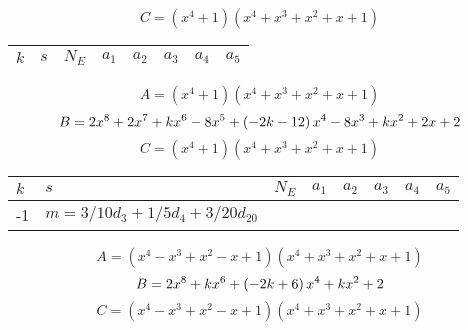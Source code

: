 \documentclass{amsart}
\begin{document}
$$C=(x^4
 + 1)(x^4
 + x^3
 + x^2
 + x
 + 1)$$
\begin{longtable}{|l|l|l|lllll|}
\hline
$k$ & $s$ & $N_E$ & $a_1$ & $a_2$ & $a_3$ & $a_4$ & $a_5$\\
\hline
\hline
\end{longtable}
$$A=(x^4
 + 1)(x^4
 + x^3
 + x^2
 + x
 + 1)$$
$$B=2\*x^8
 + 2\*x^7
 + k\*x^6
 - 8\*x^5
 + \left(-2\*k
 - 12\right) \*x^4
 - 8\*x^3
 + k\*x^2
 + 2\*x
 + 2$$
$$C=(x^4
 + 1)(x^4
 + x^3
 + x^2
 + x
 + 1)$$
\begin{longtable}{|l|l|l|lllll|}
\hline
$k$ & $s$ & $N_E$ & $a_1$ & $a_2$ & $a_3$ & $a_4$ & $a_5$\\
\hline
-1&$m=3/10d_{3}+1/5d_{4}+3/20d_{20}$&&\multicolumn{5}{c|}{}\\
\hline
\end{longtable}
$$A=(x^4
 - x^3
 + x^2
 - x
 + 1)(x^4
 + x^3
 + x^2
 + x
 + 1)$$
$$B=2\*x^8
 + k\*x^6
 + \left(-2\*k
 + 6\right) \*x^4
 + k\*x^2
 + 2$$
$$C=(x^4
 - x^3
 + x^2
 - x
 + 1)(x^4
 + x^3
 + x^2
 + x
 + 1)$$
\end{document}
